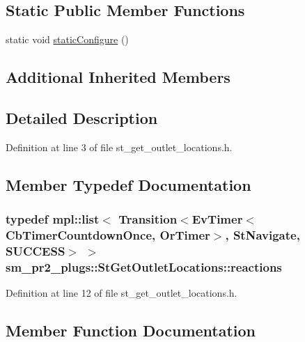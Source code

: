 \subsection*{Static Public Member Functions}
\begin{DoxyCompactItemize}
\item 
static void \hyperlink{structsm__pr2__plugs_1_1StGetOutletLocations_ae798350a0b8946793b6bf37e678d1910}{static\+Configure} ()
\end{DoxyCompactItemize}
\subsection*{Additional Inherited Members}


\subsection{Detailed Description}


Definition at line 3 of file st\+\_\+get\+\_\+outlet\+\_\+locations.\+h.



\subsection{Member Typedef Documentation}
\subsubsection[{\texorpdfstring{reactions}{reactions}}]{\setlength{\rightskip}{0pt plus 5cm}typedef mpl\+::list$<$ Transition$<$Ev\+Timer$<$Cb\+Timer\+Countdown\+Once, {\bf Or\+Timer}$>$, {\bf St\+Navigate}, {\bf S\+U\+C\+C\+E\+SS}$>$ $>$ {\bf sm\+\_\+pr2\+\_\+plugs\+::\+St\+Get\+Outlet\+Locations\+::reactions}}\hypertarget{structsm__pr2__plugs_1_1StGetOutletLocations_ac47595196c2aa76d0c1515c7bdd55542}{}\label{structsm__pr2__plugs_1_1StGetOutletLocations_ac47595196c2aa76d0c1515c7bdd55542}


Definition at line 12 of file st\+\_\+get\+\_\+outlet\+\_\+locations.\+h.



\subsection{Member Function Documentation}
